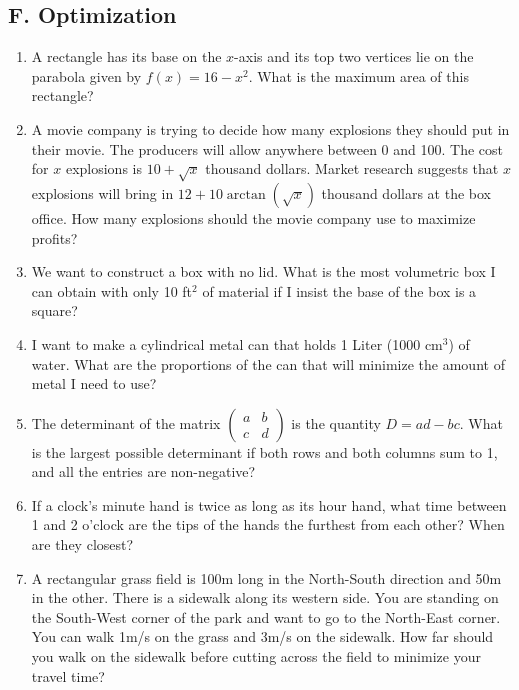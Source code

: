 \documentclass{article}
\newcommand{\R}{\mathbb{R}}
\begin{document}
\subsection*{F. Optimization}

\begin{enumerate}
\item A rectangle has its base on the $x$-axis and its top two vertices lie on the parabola given by $f(x)=16-x^2$. What is the maximum area of this rectangle?
\item A movie company is trying to decide how many explosions they should put in their movie. The producers will allow anywhere between 0 and 100. The cost for $x$ explosions is $10+\sqrt{x}$ thousand dollars. Market research suggests that $x$ explosions will bring in $12+10\arctan(\sqrt{x})$ thousand dollars at the box office. How many explosions should the movie company use to maximize profits?
\item We want to construct a box with no lid. What is the most volumetric box I can obtain with only 10 ft$^2$ of material if I insist the base of the box is a square?
\item I want to make a cylindrical metal can that holds 1 Liter (1000 cm$^3$) of water. What are the proportions of the can that will minimize the amount of metal I need to use?
\item The determinant of the matrix $\begin{pmatrix}a & b \\ c & d\end{pmatrix}$ is the quantity $D=ad-bc$. What is the largest possible determinant if both rows and both columns sum to 1, and all the entries are non-negative?
\item If a clock's minute hand is twice as long as its hour hand, what time between 1 and 2 o'clock are the tips of the hands the furthest from each other? When are they closest?
\item A rectangular grass field is 100m long in the North-South direction and 50m in the other. There is a sidewalk along its western side. You are standing on the South-West corner of the park and want to go to the North-East corner. You can walk 1m/s on the grass and 3m/s on the sidewalk. How far should you walk on the sidewalk before cutting across the field to minimize your travel time?
\end{enumerate}






\newpage




\end{document}
